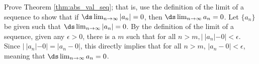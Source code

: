 {Prove Theorem \ref{thm:abs_val_seq}; that is, 
		use the definition of the limit of a sequence to show that if $\ds\lim_{n\to\infty} |a_n| = 0$, then $\ds \lim_{n\to\infty} a_n = 0$.
}
{Let $\{a_n\}$ be given such that $\ds\lim_{n\to\infty} |a_n| = 0$. By the definition of the limit of a sequence, given any $\epsilon >0$, there is a $m$ such that for all $n>m, |\ |a_n| - 0| <\epsilon$. Since $|\ |a_n|-0| = |a_n - 0|$, this directly implies that for all $n>m$, $|a_n - 0| < \epsilon$, meaning that $\ds\lim_{n\to\infty} a_n = 0$.
}
